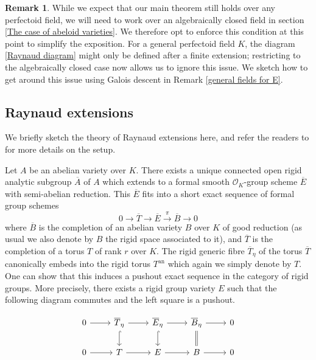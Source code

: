 \documentclass[10pt,oneside]{amsart}
\theoremstyle{definition}
\newtheorem{remark}[theorem]{Remark}
\begin{document}
	
	\begin{remark}\label{Remark on dealing with general perfectoid fields by Galois descent}
	While we expect that our main theorem still holds over any perfectoid field, we will need to work over an algebraically closed field in section \ref{The case of abeloid varieties}. We therefore opt to enforce this condition at this point to simplify the exposition. For a general perfectoid field $K$, the diagram \ref{Raynaud diagram} might only be defined after a finite extension; restricting to the algebraically closed case now allows us to ignore this issue. We sketch how to get around this issue using Galois descent in Remark \ref{general fields for E}.
	\end{remark}
	
	
	\subsection{Raynaud extensions}
	
        We briefly sketch the theory of Raynaud extensions here, and refer the readers to  \cite{rigid geometry of curves} for more details on the setup.

	Let $A$ be an abelian variety over $K$. There exists a unique connected open rigid analytic subgroup $\overline A$ of $A$ which extends to a formal smooth $\mathcal O_K$-group scheme $\overline E$ with semi-abelian reduction. This $\overline E$ fits into a short exact sequence of formal group schemes
	\begin{equation}\label{formal Raynaud extension}
	0\rightarrow \overline T \rightarrow \overline E \xrightarrow{\pi} \overline{B}\rightarrow 0
	\end{equation}
	where $\overline{B}$ is the completion of an abelian variety $B$ over $K$ of good reduction (as usual we also denote by $B$ the rigid space associated to it), and $\overline{T}$ is the completion of a torus $T$ of rank $r$ over $K$.
	The rigid generic fibre $\overline{T}_\eta$ of the torus $\overline{T}$ canonically embeds into the rigid torus $T^{\operatorname{an}}$ which again we simply denote by $T$. One can show that this induces a pushout exact sequence in the category of rigid groups. More precisely, there exists a rigid group variety $E$ such that the following diagram commutes and the left square is a pushout.
	\begin{center}
		\begin{equation}\label{Raynaud diagram}
		\begin{tikzcd}
			0 \arrow[r] & \overline{T}_\eta \arrow[d, hook] \arrow[r] & \overline{E}_\eta \arrow[d, hook] \arrow[r] & \overline{B}_\eta \arrow[d,equal] \arrow[r] & 0 \\
			0 \arrow[r] & T \arrow[r] & E \arrow[r] & B \arrow[r] & 0
		\end{tikzcd}
		\end{equation}
	\end{center}
	
\end{document}
